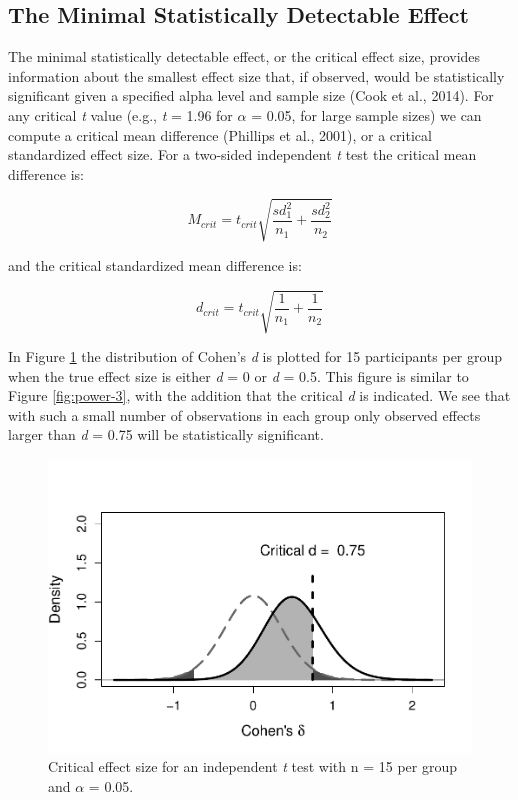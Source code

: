 \documentclass[
  english,
  ,jou, a4paper,floatsintext]{apa6}
\begin{document}
\hypertarget{the-minimal-statistically-detectable-effect}{%
\subsection{The Minimal Statistically Detectable Effect}\label{the-minimal-statistically-detectable-effect}}

The minimal statistically detectable effect, or the critical effect size, provides information about the smallest effect size that, if observed, would be statistically significant given a specified alpha level and sample size (Cook et al., 2014). For any critical \emph{t} value (e.g., \emph{t} = 1.96 for \(\alpha\) = 0.05, for large sample sizes) we can compute a critical mean difference (Phillips et al., 2001), or a critical standardized effect size. For a two-sided independent \emph{t} test the critical mean difference is:

\[M_{crit} = t_{crit}{\sqrt{\frac{sd_1^2}{n_1} + \frac{sd_2^2}{n_2}}}\]

and the critical standardized mean difference is:

\[d_{crit} = t_{crit}{\sqrt{\frac{1}{n_1} + \frac{1}{n_2}}}\]

In Figure \ref{fig:power-effect1} the distribution of Cohen's \emph{d} is plotted for 15 participants per group when the true effect size is either \emph{d} = 0 or \emph{d} = 0.5. This figure is similar to Figure \ref{fig:power-3}, with the addition that the critical \emph{d} is indicated. We see that with such a small number of observations in each group only observed effects larger than \emph{d} = 0.75 will be statistically significant.

\begin{figure}
\centering
\includegraphics{sample_size_justification_files/figure-latex/power-effect1-1.pdf}
\caption{\label{fig:power-effect1}Critical effect size for an independent \emph{t} test with n = 15 per group and \(\alpha\) = 0.05.}
\end{figure}
\end{document}
